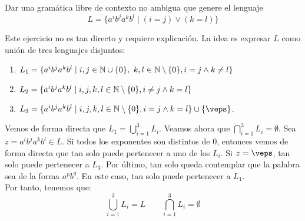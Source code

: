 \begin{ejercicio}\label{ej:1.4.5}
    Dar una gramática libre de contexto no ambigua que genere el lenguaje
    \begin{equation*}
        L = \{ a^i b^j a^k b^l \mid (i = j) \lor (k = l) \}
    \end{equation*}
    
    Este ejercicio no es tan directo y requiere explicación. La idea es expresar $L$ como unión de tres lenguajes disjuntos:
    \begin{enumerate}
        \item $L_1 = \{ a^i b^j a^k b^l \mid i,j\in \mathbb{N}\cup \{0\},~k,l\in \mathbb{N}\setminus \{0\},
        i = j \land k \neq l \}$
        \item $L_2 = \{ a^i b^j a^k b^l \mid i,j,k,l\in \mathbb{N}\setminus \{0\},
        i \neq j \land k = l \}$
        \item $L_3 = \{ a^i b^j a^k b^l \mid i,j,k,l\in \bb{N}\setminus \{0\},
        i = j \land k = l \} \cup \{\veps\}$.
    \end{enumerate}
    
    Vemos de forma directa que $L_1=\bigcup\limits_{i=1}^3 L_i$. Veamos ahora que $\bigcap\limits_{i=1}^3 L_i = \emptyset$. Sea $z=a^ib^ja^kb^l\in L$. Si todos los exponentes son distintos de $0$, entonces vemos de forma directa que tan solo puede pertenecer a uno de los $L_i$. Si $z=\veps$, tan solo puede pertenecer a $L_3$. Por último, tan solo queda contemplar que la palabra sea de la forma $a^pb^q$. En este caso, tan solo puede pertenecer a $L_1$.\\

    Por tanto, tenemos que:
    \begin{equation*}
        \bigcup\limits_{i=1}^3 L_i = L\qquad \bigcap\limits_{i=1}^3 L_i = \emptyset
    \end{equation*}


\end{ejercicio}
